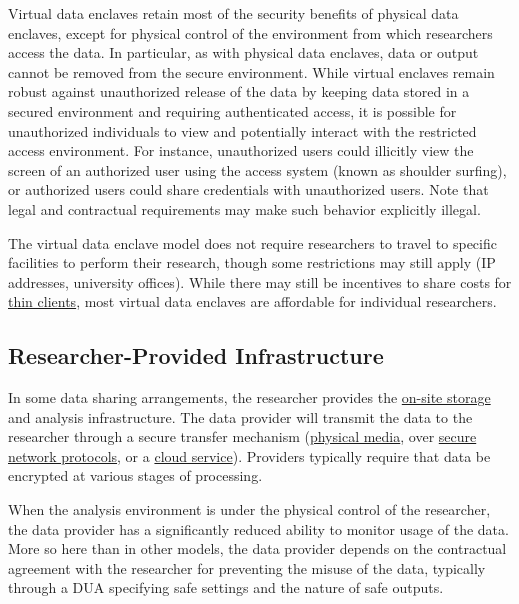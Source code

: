 Virtual data enclaves retain most of the security benefits of physical data enclaves, except for physical control of the environment from which researchers access the data. In particular, as with physical data enclaves, data or output cannot be removed from the secure environment. While virtual enclaves remain robust against unauthorized release of the data by keeping data stored in a secured environment and requiring authenticated access, it is possible for unauthorized individuals to view and potentially interact with the restricted access environment. For instance, unauthorized users could illicitly view the screen of an authorized user using the access system (known as shoulder surfing), or authorized users could share credentials with unauthorized users. Note that legal and contractual requirements may make such behavior explicitly illegal.

The virtual data enclave model does not require researchers to travel to specific facilities to perform their research, though some restrictions may still apply (IP addresses, university offices). While there may still be incentives to share costs for \protect\hyperlink{thin-clients}{thin clients}, most virtual data enclaves are affordable for individual researchers.

\hypertarget{researcher-provided-infrastructure}{%
\subsection{Researcher-Provided Infrastructure}\label{researcher-provided-infrastructure}}

In some data sharing arrangements, the researcher provides the \protect\hyperlink{storage-of-data}{on-site storage} and analysis infrastructure. The data provider will transmit the data to the researcher through a secure transfer mechanism (\protect\hyperlink{physical-media}{physical media}, over \protect\hyperlink{secure-network-protocols}{secure network protocols}, or a \protect\hyperlink{cloud-service}{cloud service}). Providers typically require that data be encrypted at various stages of processing.

When the analysis environment is under the physical control of the researcher, the data provider has a significantly reduced ability to monitor usage of the data. More so here than in other models, the data provider depends on the contractual agreement with the researcher for preventing the misuse of the data, typically through a DUA specifying safe settings and the nature of safe outputs.

